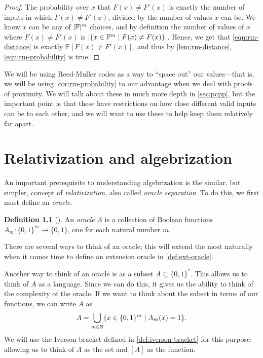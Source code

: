 \documentclass[english,12pt]{reedthesis}
\theoremstyle{plain}
\theoremstyle{definition}
\newtheorem{defn}[defn]{Definition}
\theoremstyle{remark}
\DeclarePairedDelimiter{\abs}{\lvert}{\rvert}
\begin{document}
\begin{proof}
  The probability over $x$ that $F(x) \ne F'(x)$ is exactly the number of inputs
  in which $F(x) \ne F'(x)$, divided by the number of values $x$ can be. We know
  $x$ can be any of $\abs{\mathbb{F}}^{m}$ choices, and by definition the number
  of values of $x$ where $F(x) \ne F'(x)$ is
  $\abs{\{x \in \mathbb{F}^{m} \mid F(x) \ne F(x)\}}$. Hence, we get that
  \cref{eqn:rm-distance} is exactly $\mathbb{P}[F(x) \ne F'(x)]$, and thus by
  \cref{lem:rm-distance}, \cref{eqn:rm-probability} is true.
\end{proof}

We will be using Reed-Muller codes as a way to ``space out'' our values---that is,
we will be using \cref{cor:rm-probability} to our advantage when we deal with
proofs of proximity. We will talk about these in much more depth in
\cref{sec:pcpp}, but the important point is that these have restrictions on how
close different valid inputs can be to each other, and we will want to use these
to help keep them relatively far apart.

\chapter{Relativization and algebrization}

An important prerequisite to understanding algebrization is the similar, but
simpler, concept of \emph{relativization}, also called \emph{oracle separation}.
To do this, we first must define an \emph{oracle}.
\begin{defn}[{\cite[Def.\ 2.1]{AW09}}]\label{def:oracle}
  An \emph{oracle} $A$ is a collection of Boolean functions
  $A_{m}\colon \{0, 1\}^{m} \rightarrow \{0, 1\}$, one for each natural number $m$.
\end{defn}
There are several ways to think of an oracle; this will extend the most
naturally when it comes time to define an extension oracle in
\cref{def:ext-oracle}.

Another way to think of an oracle is as a subset $A \subseteq \{0, 1\}^{*}$. This allows
us to think of $A$ as a language. Since we can do this, it gives us the ability
to think of the complexity of the oracle. If we want to think about the subset
in terms of our functions, we can write $A$ as
\begin{equation}
  A = \bigcup_{m \in \mathbb{N}}\mleft\{x \in \{0, 1\}^{m} \mid A_{m}(x) = 1\mright\}.
\end{equation}
We will use the Iverson bracket defined in \cref{def:iverson-bracket} for this
purpose: allowing us to think of $A$ as the set and $[A]$ as the function.
\end{document}
